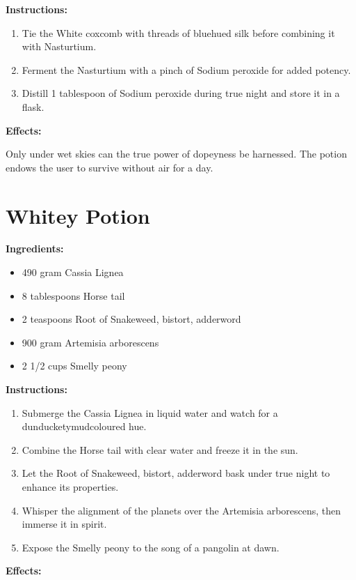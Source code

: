 \documentclass{article}
\begin{document}
\textbf{Instructions:}

\begin{enumerate}
  \item Tie the White coxcomb with threads of bluehued silk before combining it with Nasturtium.
  \item Ferment the Nasturtium with a pinch of Sodium peroxide for added potency.
  \item Distill 1 tablespoon of Sodium peroxide during true night and store it in a flask.
\end{enumerate}

\textbf{Effects:}

Only under wet skies can the true power of dopeyness be harnessed. The potion endows the user to survive without air for a day.

\newpage
\section*{Whitey Potion}

\textbf{Ingredients:}

\begin{itemize}
  \item 490 gram Cassia Lignea
  \item 8 tablespoons Horse tail
  \item 2 teaspoons Root of Snakeweed, bistort, adderword
  \item 900 gram Artemisia arborescens
  \item 2 1/2 cups Smelly peony
\end{itemize}

\textbf{Instructions:}

\begin{enumerate}
  \item Submerge the Cassia Lignea in liquid water and watch for a dunducketymudcoloured hue.
  \item Combine the Horse tail with clear water and freeze it in the sun.
  \item Let the Root of Snakeweed, bistort, adderword bask under true night to enhance its properties.
  \item Whisper the alignment of the planets over the Artemisia arborescens, then immerse it in spirit.
  \item Expose the Smelly peony to the song of a pangolin at dawn.
\end{enumerate}

\textbf{Effects:}
\end{document}

